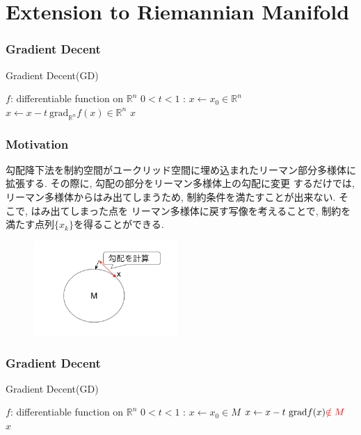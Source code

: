 \documentclass[dvipdfmx,11pt]{beamer}		%
\newcommand{\R}{\mathbb{R}}
\begin{document}
    
   
    \section{Extension to Riemannian Manifold}

    \begin{frame}

        \frametitle{Gradient Decent}
        \begin{algorithm}[H]
            \caption{Gradient Decent(GD)}
            \begin{algorithmic}
                \REQUIRE $f$: differentiable function on $\R^{n}$
                \REQUIRE $0< t <1$ : 
                \STATE $x\leftarrow x_{0}\in\R^n$
                \STATE $x\leftarrow x - t~\mathrm{grad}_{\R^n} f(x)\in\R^n$ 
                \ENDWHILE
                \RETURN $x$
            \end{algorithmic}
        \end{algorithm}
    \end{frame}
    \begin{frame}\frametitle{Motivation}
        勾配降下法を制約空間がユークリッド空間に埋め込まれたリーマン部分多様体に拡張する. その際に, 勾配の部分をリーマン多様体上の勾配に変更
        するだけでは, リーマン多様体からはみ出てしまうため, 制約条件を満たすことが出来ない. そこで, はみ出てしまった点を
        リーマン多様体に戻す写像を考えることで, 制約を満たす点列$\{x_k\}$を得ることができる.
        \begin{figure}
            \centering
            \includegraphics[width = 5.5cm]{../Images/retraction_flow.png}
        \end{figure}
    \end{frame}

    \begin{frame}

        \frametitle{Gradient Decent}
        \begin{algorithm}[H]
            \caption{Gradient Decent(GD)}
            \begin{algorithmic}
                \REQUIRE $f$: differentiable function on $\R^{n}$
                \REQUIRE $0< t <1$ : 
                \STATE $x\leftarrow x_{0}\in M$
                \STATE $x\leftarrow x - t~\mathrm{grad} f(x){\color{red}\notin M}$ 
                \ENDWHILE
                \RETURN $x$
            \end{algorithmic}
        \end{algorithm}
    \end{frame}
\end{document}
